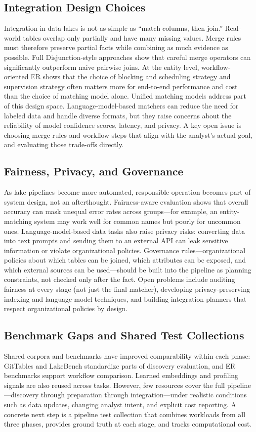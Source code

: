 \documentclass[sigconf]{acmart}
\begin{document}
\subsection{Integration Design Choices}
Integration in data lakes is not as simple as ``match columns, then join.'' Real-world tables overlap only partially and have many missing values. Merge rules must therefore preserve partial facts while combining as much evidence as possible. Full Disjunction-style approaches show that careful merge operators can significantly outperform naive pairwise joins. At the entity level, workflow-oriented ER shows that the choice of blocking and scheduling strategy and supervision strategy often matters more for end-to-end performance and cost than the choice of matching model alone. Unified matching models address part of this design space. Language-model-based matchers can reduce the need for labeled data and handle diverse formats, but they raise concerns about the reliability of model confidence scores, latency, and privacy. A key open issue is choosing merge rules and workflow steps that align with the analyst's actual goal, and evaluating those trade-offs directly.

\subsection{Fairness, Privacy, and Governance}
As lake pipelines become more automated, responsible operation becomes part of system design, not an afterthought. Fairness-aware evaluation shows that overall accuracy can mask unequal error rates across groups---for example, an entity-matching system may work well for common names but poorly for uncommon ones. Language-model-based data tasks also raise privacy risks: converting data into text prompts and sending them to an external API can leak sensitive information or violate organizational policies. Governance rules---organizational policies about which tables can be joined, which attributes can be exposed, and which external sources can be used---should be built into the pipeline as planning constraints, not checked only after the fact. Open problems include auditing fairness at every stage (not just the final matcher), developing privacy-preserving indexing and language-model techniques, and building integration planners that respect organizational policies by design.

\subsection{Benchmark Gaps and Shared Test Collections}
Shared corpora and benchmarks have improved comparability within each phase: GitTables and LakeBench standardize parts of discovery evaluation, and ER benchmarks support workflow comparison. Learned embeddings and profiling signals are also reused across tasks. However, few resources cover the full pipeline---discovery through preparation through integration---under realistic conditions such as data updates, changing analyst intent, and explicit cost reporting. A concrete next step is a pipeline test collection that combines workloads from all three phases, provides ground truth at each stage, and tracks computational cost.
\end{document}
